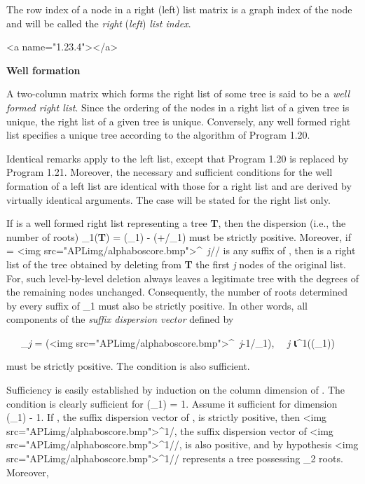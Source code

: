 {\par The row index of a node in a right (left) list matrix is a graph index of the node and will be called the \textit{right} (\textit{left}) \textit{list index}.



<a name="1.23.4"></a>
\par \textbf{Well formation}

\par A two-column matrix which forms the right list of some tree is said to be a \textit{well formed right list}. Since the ordering of the nodes in a right list of a given tree is unique, the right list of a given tree is unique. Conversely, any well formed right list specifies a unique tree according to the algorithm of Program 1.20.

\par Identical remarks apply to the left list, except that Program 1.20 is replaced by Program 1.21. Moreover, the necessary and sufficient conditions for the well formation of a left list are identical with those for a right list and are derived by virtually identical arguments. The case will be stated for the right list only.

\par If  is a well formed right list representing a tree \textbf{T}, then the dispersion (i.e., the number of roots) 
\textbf{\nu}_{1}(\textbf{T}) = 
\textit{\nu}(_{1}) - (+/_{1}) must be strictly positive. Moreover, if 
 = 
<img src="APLimg/alphaboscore.bmp">^{\textit{\ j}}// is any suffix of , then  is a right list of the tree obtained by deleting from \textbf{T} the first \textit{j} nodes of the original list. For, such level-by-level deletion always leaves a legitimate tree with the degrees of the remaining nodes unchanged. Consequently, the number of roots determined by every suffix of _{1} must also be strictly positive. In other words, all components of the \textit{suffix dispersion vector}  defined by

\par \ \ \ 
_{\textit{j}} = 
\textit{\nu}(<img src="APLimg/alphaboscore.bmp">^{\textit{\ j}-1}/_{1}), \ \ \textit{j} \epsilon 
\textbf{⍳}^{1}(\textit{\nu}(\mathbf{R}_{1}))
\par must be strictly positive. The condition is also sufficient.

\par Sufficiency is easily established by induction on the column dimension of . The condition is clearly sufficient for \textit{\nu}(_{1}) = 1. Assume it sufficient for dimension 
\textit{\nu}(_{1}) - 1. If , the suffix dispersion vector of \mathbf{R}, is strictly positive, then <img src="APLimg/alphaboscore.bmp">^{1}/\mathbf{s}, the suffix dispersion vector of <img src="APLimg/alphaboscore.bmp">^{1}//\mathbf{R}, is also positive, and by hypothesis 
<img src="APLimg/alphaboscore.bmp">^{1}//\mathbf{R} represents a tree \mathbf{G} possessing \mathbf{s}_{2} roots. Moreover,

}
